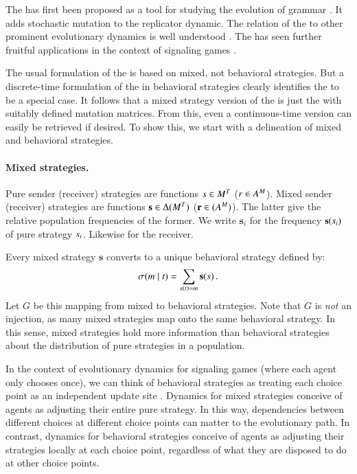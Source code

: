 \documentclass[fleqn,reqno,10pt]{article}
\renewcommand{\Smixed}{\ensuremath{\mathrm{\mathbf{s}}}}
\renewcommand{\Rmixed}{\ensuremath{\mathrm{\mathbf{r}}}}
\newcommand{\rmd}{\acro{rmd}} %
\newcommand{\rdd}{\acro{rdd}} %
\begin{document}
The \rmd has first been proposed as a tool for studying the evolution
of grammar
\citep[e.g.][]{KomarovaNiyogi2001:The-Evolutionar,NowakKomarova2001:Evolution-of-Un}. It
adds stochastic mutation to the replicator dynamic. The relation of
the \rmd to other prominent evolutionary dynamics is well understood
\citep{PageNowak2002:Unifying-Evolut}. The \rmd has seen further
fruitful applications in the context of signaling games
\citep[e.g.][]{HutteggerSkyrms2010:Evolutionary-Dy}.

The usual formulation of the \rmd is based on mixed, not behavioral
strategies. But a discrete-time formulation of the \rmd in behavioral
strategies clearly identifies the \rdd to be a special case. It
follows that a mixed strategy version of the \rdd is just the \rmd
with suitably defined mutation matrices. From this, even a
continuous-time version can easily be retrieved if desired. To show
this, we start with a delineation of mixed and behavioral strategies.

\paragraph{Mixed strategies.} Pure sender (receiver) strategies are
functions $s \in M^T$ ($r \in
A^M$). Mixed sender (receiver) strategies are functions
$\Smixed \in \Delta(\Messgs^\States)$ ($\Rmixed \in
(\Acts^\Messgs)$). The latter give the relative population frequencies
of the former. We write $\Smixed_i$ for the frequency
$\Smixed(\Spure_i)$ of pure strategy $s_i$. Likewise for the
receiver.

Every mixed strategy $\Smixed$ converts to a unique behavioral
strategy defined by:
\begin{align}
  \label{eq:CorrespondenceBehavioralMixed}
  \Sstrat(\messg \probbar \state) = \sum_{\Spure(\state) = \messg} \Smixed(\Spure)\,.
\end{align}
Let $G$ be this mapping from mixed to behavioral strategies. Note that $G$
is \emph{not} an injection, as many mixed strategies map onto the same
behavioral strategy. In this sense, mixed strategies hold more
information than behavioral strategies about the distribution of pure strategies in a population.

In the context of evolutionary dynamics for signaling games (where
each agent only chooses once), we can think of behavioral strategies
as treating each choice point as an independent update site
\citep[e.g.][]{Cressman2003:Evolutionary-Dy}. Dynamics for mixed
strategies conceive of agents as adjusting their entire pure
strategy. In this way, dependencies between different choices at
different choice points can matter to the evolutionary path. In
contrast, dynamics for behavioral strategies conceive of agents as
adjusting their strategies locally at each choice point, regardless of
what they are disposed to do at other choice points.
\end{document}

